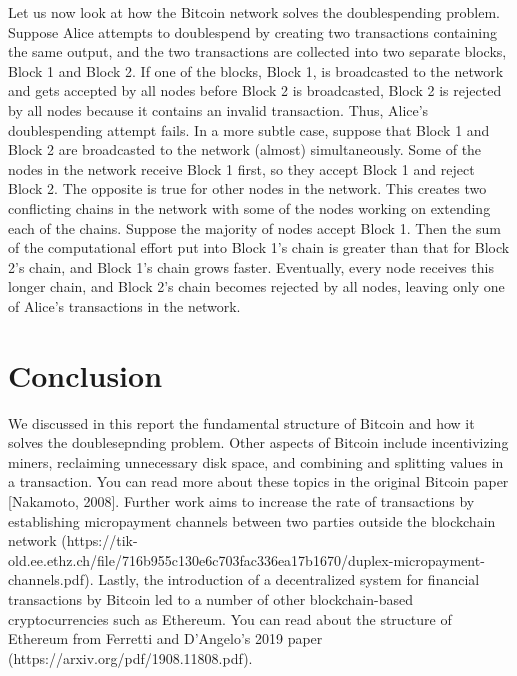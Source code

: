 \documentclass{article}
\begin{document}
Let us now look at how the Bitcoin network solves the doublespending problem. Suppose Alice attempts to doublespend by creating two transactions containing the same output, and the two transactions are collected into two separate blocks, Block 1 and Block 2. If one of the blocks, Block 1, is broadcasted to the network and gets accepted by all nodes before Block 2 is broadcasted, Block 2 is rejected by all nodes because it contains an invalid transaction. Thus, Alice’s doublespending attempt fails. In a more subtle case, suppose that Block 1 and Block 2 are broadcasted to the network (almost) simultaneously. Some of the nodes in the network receive Block 1 first, so they accept Block 1 and reject Block 2. The opposite is true for other nodes in the network. This creates two conflicting chains in the network with some of the nodes working on extending each of the chains. Suppose the majority of nodes accept Block 1. Then the sum of the computational effort put into Block 1’s chain is greater than that for Block 2’s chain, and Block 1’s chain grows faster. Eventually, every node receives this longer chain, and Block 2’s chain becomes rejected by all nodes, leaving only one of Alice’s transactions in the network.

\section{Conclusion}
We discussed in this report the fundamental structure of Bitcoin and how it solves the doublesepnding problem. Other aspects of Bitcoin include incentivizing miners, reclaiming unnecessary disk space, and combining and splitting values in a transaction. You can read more about these topics in the original Bitcoin paper [Nakamoto, 2008]. Further work aims to increase the rate of transactions  by establishing micropayment channels between two parties outside the blockchain network (https://tik-old.ee.ethz.ch/file/716b955c130e6c703fac336ea17b1670/duplex-micropayment-channels.pdf). Lastly, the introduction of a decentralized system for financial transactions by Bitcoin led to a number of other blockchain-based cryptocurrencies such as Ethereum. You can read about the structure of Ethereum from Ferretti and D’Angelo’s 2019 paper (https://arxiv.org/pdf/1908.11808.pdf). 



\end{document}
